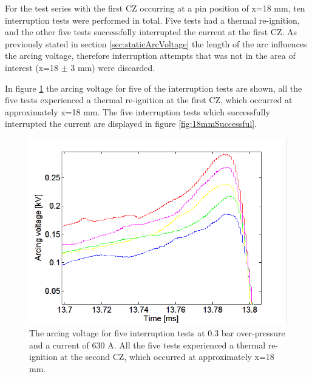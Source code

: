\documentclass[10pt,b5paper,twoside]{article}
\begin{document}
For the test series with the first CZ occurring at a pin position of x=18 mm, ten interruption tests were performed in total. Five tests had a thermal re-ignition, and the other five tests successfully interrupted the current at the first CZ. As previously stated in section \ref{sec:staticArcVoltage} the length of the arc influences the arcing voltage, therefore interruption attempts that was not in the area of interest (x=18 $\pm$ 3 mm) were discarded.

In figure \ref{fig:18mmUnSuccessful} the arcing voltage for five of the interruption tests are shown, all the five tests experienced a thermal re-ignition at the first CZ, which occurred at approximately x=18 mm. The five interruption tests which successfully interrupted the current are displayed in figure \ref{fig:18mmSuccessful}.

\begin{figure}[H]
\centering
\includegraphics[scale=0.6, angle =0 ]{Bilder/Results/ArcingVoltage_18_reIgnition.PNG}
\caption{The arcing voltage for five interruption tests at 0.3 bar over-pressure and a current of 630 A. All the five tests experienced a thermal re-ignition at the second CZ, which occurred at approximately  x=18 mm.} \label{fig:18mmUnSuccessful}
\end{figure}
\end{document}
